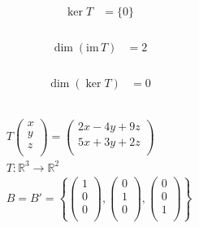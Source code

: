 \documentclass[fleqn, a4paper, twocolumn, draft]{article}
\theoremstyle{definition}
\theoremstyle{theorem}
\theoremstyle{remark}
\newcommand{\im}{\mathrm{im}\,}
\numberwithin{corollary}{theorem}
\numberwithin{equation}{theorem}
\begin{document}
\subsubsection{}

\begin{align*}
	\ker T &= \{0\}
\end{align*}

\subsubsection{}

\begin{align*}
	\dim (\im T) &= 2
\end{align*}

\subsubsection{}

\begin{align*}
	\dim (\ker T) &= 0
\end{align*}

\subsection{}

\begin{gather*}
	T 
		\begin{pmatrix}
			x\\
			y\\
			z\\
		\end{pmatrix}
	=
		\begin{pmatrix}
			2x - 4y + 9z\\
			5x + 3y + 2z\\
		\end{pmatrix}\\
	T : \mathbb{R}^3 \to \mathbb{R}^2\\
	B = B' = 
		\left\lbrace
			\begin{pmatrix}
				1\\
				0\\
				0\\
			\end{pmatrix}
			,
			\begin{pmatrix}
				0\\
				1\\
				0\\
			\end{pmatrix}
			,
			\begin{pmatrix}
				0\\
				0\\
				1\\
			\end{pmatrix}
		\right\rbrace
\end{gather*}
\end{document}
